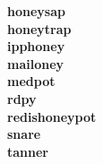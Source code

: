 \textbf{honeysap} \cite{honeysap2021}\\

\textbf{honeytrap} \cite{honeytrap2021}\\

\textbf{ipphoney} \cite{ipphoney2021}\\

\textbf{mailoney} \\

\textbf{medpot} \cite{medpot2021}\\

\textbf{rdpy} \cite{rdpy2021}\\

\textbf{redishoneypot} \\

\textbf{snare} \cite{snare2021}\\

\textbf{tanner} \cite{tanner2021}\\



